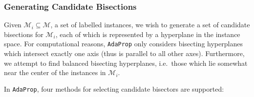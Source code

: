 \documentclass[a4paper,12pt]{article} %
\newcommand{\AdaProp}{\texttt{AdaProp}\xspace}
\newcommand{\mcl}[1]{\mathcal{#1}}
\begin{document}
\subsubsection{Generating Candidate Bisections}
\label{secCandGen}

Given $\mcl{M}_i \subseteq \mcl{M}$, 
    a set of labelled instances, 
    we wish to generate a set of candidate bisections for $\mcl{M}_i$,
    each of which is represented by a hyperplane in the instance space.
For computational reasons, 
    \AdaProp only considers bisecting hyperplanes 
    which intersect exactly one axis
    (thus is parallel to all other axes).
Furthermore, we attempt to find balanced bisecting hyperplanes, 
    i.e.\ those which lie somewhat near the center of the instances
    in $\mcl{M}_i$.

In \AdaProp, four methods for selecting candidate bisectors are supported:
\end{document}
